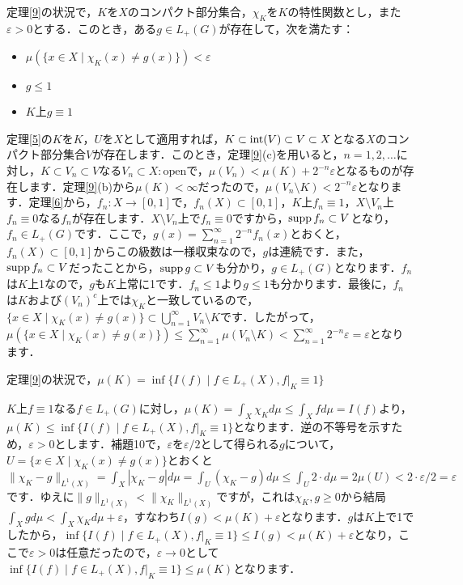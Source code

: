 \begin{ylem}\label{10}
定理\ref{9}の状況で，$K$を$X$のコンパクト部分集合，$\chi_{K}$を$K$の特性関数とし，また$\varepsilon >0$とする．このとき，ある$g \in L_{+}(G)$が存在して，次を満たす：
\begin{itemize}
 \item $\mu ( \{ x \in X \mid \chi_{K}(x) \neq g(x) \} ) < \varepsilon $
 \item $g \le 1$
 \item $K$上$g \equiv 1$
\end{itemize}
\end{ylem}
\begin{Proof}
定理\ref{5}の$K$を$K$，$U$を$X$として適用すれば，$K \subset \operatorname{int}(V) \subset V \subset X$となる$X$のコンパクト部分集合$V$が存在します．このとき，定理\ref{9}(c)を用いると，$n=1,2,\ldots$に対し，$K \subset V_n \subset V$なる$V_n \subset X \colon \mathrm{open}$で，$\mu(V_n) < \mu(K) + 2^{-n}\varepsilon$となるものが存在します．定理\ref{9}(b)から$\mu(K)<\infty$だったので，$\mu(V_n \setminus K) < 2^{-n}\varepsilon$となります．定理\ref{6}から，$f_n \colon X \to [0,1]$で，$f_n(X) \subset [0,1]$，$K$上$f_n \equiv 1$，$X \setminus V_n$上$f_n \equiv 0$なる$f_n$が存在します．$X \setminus V_{n}$上で$f_{n} \equiv 0$ですから，$\operatorname{supp} f_{n} \subset V$となり，$f_{n} \in L_{+}(G)$です．ここで，$g(x)=\sum_{n=1}^{\infty}2^{-n}f_n(x)$とおくと，$f_{n}(X) \subset [0,1]$からこの級数は一様収束なので，$g$は連続です．また，$\operatorname{supp} f_{n} \subset V$だったことから，$\operatorname{supp} g \subset V$も分かり，$g \in L_{+}(G)$となります．$f_n$は$K$上1なので，$g$も$K$上常に1です．$f_n \le 1$より$g \le 1$も分かります．最後に，$f_n$は$K$および$(V_n)^{c}$上では$\chi_{K}$と一致しているので，$\{ x \in X \mid \chi_{K}(x) \neq g(x) \} \subset \bigcup_{n=1}^{\infty}V_n \setminus K$です．したがって，$\mu( \{ x \in X \mid \chi_{K}(x) \neq g(x) \} ) \le \sum_{n=1}^{\infty} \mu(V_n \setminus K) < \sum_{n=1}^{\infty}2^{-n}\varepsilon=\varepsilon$となります．
\end{Proof}
\begin{yprop}\label{11}
定理\ref{9}の状況で，$\mu(K)= \inf \{ I(f) \mid f \in L_{+}(X), f|_{K} \equiv 1 \}$
\end{yprop}
\begin{Proof}
$K$上$f \equiv 1$なる$f \in L_{+}(G)$に対し，$ \mu(K)=\int_{X}\chi_K d\mu \le \int_{X}f d\mu=I(f)$より，$\mu(K) \le \inf \{ I(f) \mid f \in L_{+}(X), f|_{K} \equiv 1 \}$となります．逆の不等号を示すため，$\varepsilon>0$とします．補題10で，$\varepsilon$を$\varepsilon /2$として得られる$g$について，$U=\{ x \in X \mid \chi_{K}(x) \neq g(x) \}$とおくと$\| \chi_{K}-g\| _{L^1(X)} = \int_{X}|\chi_K-g|d\mu = \int_{U}(\chi_K-g)d\mu \le \int_{U}2 \cdot d\mu=2\mu(U)<2 \cdot \varepsilon / 2=\varepsilon$です．ゆえに$\| g\|  _{L^1(X)} < \| \chi_{K} \| _{L^1(X)} $ですが，これは$\chi_K, g \ge 0$から結局 $\int_{X}gd\mu < \int_{X}\chi_{K}d\mu +\varepsilon$，すなわち$I(g)<\mu (K)+\varepsilon$となります．$g$は$K$上で1でしたから，$\inf \{ I(f) \mid f \in L_{+}(X), f|_{K} \equiv 1 \} \le I(g) <\mu (K)+\varepsilon$となり，ここで$\varepsilon>0$は任意だったので，$\varepsilon \to 0$として $\inf \{ I(f) \mid f \in L_{+}(X), f|_{K} \equiv 1 \} \le \mu (K)$となります．
\end{Proof}

